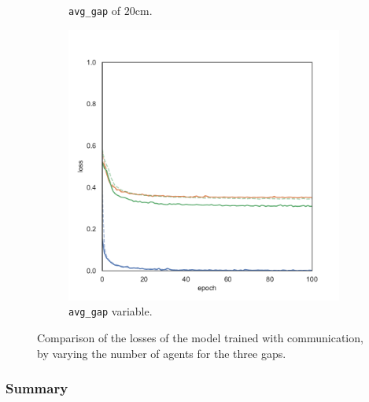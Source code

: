 \begin{figure}[!htb]
\begin{center}
\begin{subfigure}[h]{0.32\textwidth}
			\caption{\texttt{avg\_gap} of $20$\gls{cm}.}
		\end{subfigure}
		\hfill
		\begin{subfigure}[h]{0.32\textwidth}
			\includegraphics[width=\textwidth]{contents/images/task2/loss-communication-gap_var}
			\caption{\texttt{avg\_gap} variable.}
		\end{subfigure}
	\end{center}
	\vspace{-0.5cm}
	\caption[Losses summary of the second task (communication).]{Comparison of 
	the losses of the model trained with communication, by varying the number of 
	agents for the three gaps.}
	\label{fig:commlosst2}
\end{figure}
\subsubsection{Summary}
\label{subsubsec:summary1}
